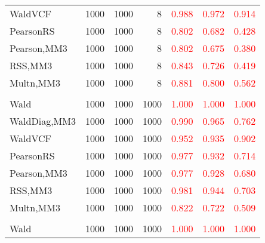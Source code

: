 \documentclass[
]{article}
\begin{document}
\begin{table}[H]
{\begin{tabular}[t]{lrrrrrr}
\hspace{1em}WaldVCF & 1000 & 1000 & 8 & \textcolor{red}{0.988} & \textcolor{red}{0.972} & \textcolor{red}{0.914}\\
\hspace{1em}PearsonRS & 1000 & 1000 & 8 & \textcolor{red}{0.802} & \textcolor{red}{0.682} & \textcolor{red}{0.428}\\
\hspace{1em}Pearson,MM3 & 1000 & 1000 & 8 & \textcolor{red}{0.802} & \textcolor{red}{0.675} & \textcolor{red}{0.380}\\
\hspace{1em}RSS,MM3 & 1000 & 1000 & 8 & \textcolor{red}{0.843} & \textcolor{red}{0.726} & \textcolor{red}{0.419}\\
\hspace{1em}Multn,MM3 & 1000 & 1000 & 8 & \textcolor{red}{0.881} & \textcolor{red}{0.800} & \textcolor{red}{0.562}\\
\addlinespace[0.3em]
\multicolumn{7}{l}{\textbf{1F 15V}}\\
\hspace{1em}Wald & 1000 & 1000 & 1000 & \textcolor{red}{1.000} & \textcolor{red}{1.000} & \vphantom{2} \textcolor{red}{1.000}\\
\hspace{1em}WaldDiag,MM3 & 1000 & 1000 & 1000 & \textcolor{red}{0.990} & \textcolor{red}{0.965} & \textcolor{red}{0.762}\\
\hspace{1em}WaldVCF & 1000 & 1000 & 1000 & \textcolor{red}{0.952} & \textcolor{red}{0.935} & \textcolor{red}{0.902}\\
\hspace{1em}PearsonRS & 1000 & 1000 & 1000 & \textcolor{red}{0.977} & \textcolor{red}{0.932} & \textcolor{red}{0.714}\\
\hspace{1em}Pearson,MM3 & 1000 & 1000 & 1000 & \textcolor{red}{0.977} & \textcolor{red}{0.928} & \textcolor{red}{0.680}\\
\hspace{1em}RSS,MM3 & 1000 & 1000 & 1000 & \textcolor{red}{0.981} & \textcolor{red}{0.944} & \textcolor{red}{0.703}\\
\hspace{1em}Multn,MM3 & 1000 & 1000 & 1000 & \textcolor{red}{0.822} & \textcolor{red}{0.722} & \textcolor{red}{0.509}\\
\addlinespace[0.3em]
\multicolumn{7}{l}{\textbf{2F 10V}}\\
\hspace{1em}Wald & 1000 & 1000 & 1000 & \textcolor{red}{1.000} & \textcolor{red}{1.000} & \vphantom{1} \textcolor{red}{1.000}\\

\end{tabular}}
\end{table}
\end{document}
